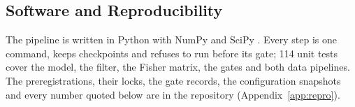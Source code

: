 \subsection{Software and Reproducibility}
\label{sec:software}
The pipeline is written in Python with NumPy and SciPy \cite{Harris2020,Virtanen2020}. Every step is one command, keeps checkpoints and refuses to run before its gate; 114 unit tests cover the model, the filter, the Fisher matrix, the gates and both data pipelines. The preregistrations, their locks, the gate records, the configuration snapshots and every number quoted below are in the repository (Appendix~\ref{app:repro}).
